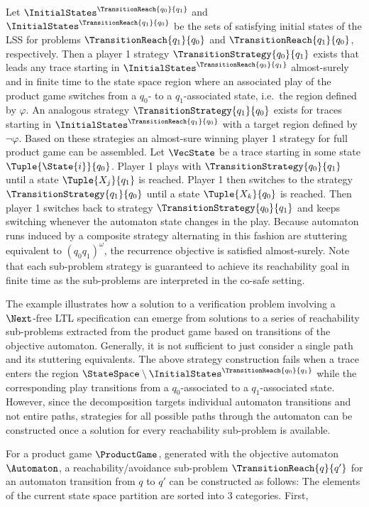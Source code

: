     Let $\InitialStates^\TransitionReach{q_0}{q_1}$ and $\InitialStates^\TransitionReach{q_1}{q_0}$ be the sets of satisfying initial states of the LSS for problems $\TransitionReach{q_1}{q_0}$ and $\TransitionReach{q_1}{q_0}$, respectively.
    Then a player 1 strategy $\TransitionStrategy{q_0}{q_1}$ exists that leads any trace starting in $\InitialStates^\TransitionReach{q_0}{q_1}$ almost-surely and in finite time to the state space region where an associated play of the product game switches from a $q_0$- to a $q_1$-associated state, i.e.\ the region defined by $\varphi$.
    An analogous strategy $\TransitionStrategy{q_1}{q_0}$ exists for traces starting in $\InitialStates^\TransitionReach{q_1}{q_0}$ with a target region defined by $\neg \varphi$.
    Based on these strategies an almost-sure winning player 1 strategy for full product game can be assembled.
    Let $\VecState$ be a trace starting in some state $\Tuple{\State{i}}{q_0}$.
    Player 1 plays with $\TransitionStrategy{q_0}{q_1}$ until a state $\Tuple{X_j}{q_1}$ is reached.
    Player 1 then switches to the strategy $\TransitionStrategy{q_1}{q_0}$ until a state $\Tuple{X_k}{q_0}$ is reached.
    Then player 1 switches back to strategy $\TransitionStrategy{q_0}{q_1}$ and keeps switching whenever the automaton state changes in the play.
    Because automaton runs induced by a composite strategy alternating in this fashion are stuttering equivalent to $(q_0 q_1)^\omega$, the recurrence objective is satisfied almost-surely.
    Note that each sub-problem strategy is guaranteed to achieve its reachability goal in finite time as the sub-problems are interpreted in the co-safe setting.

    The example illustrates how a solution to a verification problem involving a $\Next$-free LTL specification can emerge from solutions to a series of reachability sub-problems extracted from the product game based on transitions of the objective automaton.
    Generally, it is not sufficient to just consider a single path and its stuttering equivalents.
    The above strategy construction fails when a trace enters the region $\StateSpace \setminus \InitialStates^\TransitionReach{q_0}{q_1}$ while the corresponding play transitions from a $q_0$-associated to a $q_1$-associated state.
    However, since the decomposition targets individual automaton transitions and not entire paths, strategies for all possible paths through the automaton can be constructed once a solution for every reachability sub-problem is available.

    For a product game $\ProductGame$, generated with the objective automaton $\Automaton$, a reachability/avoidance sub-problem $\TransitionReach{q}{q'}$ for an automaton transition from $q$ to $q'$ can be constructed as follows:
    The elements of the current state space partition are sorted into 3 categories.
    First,

